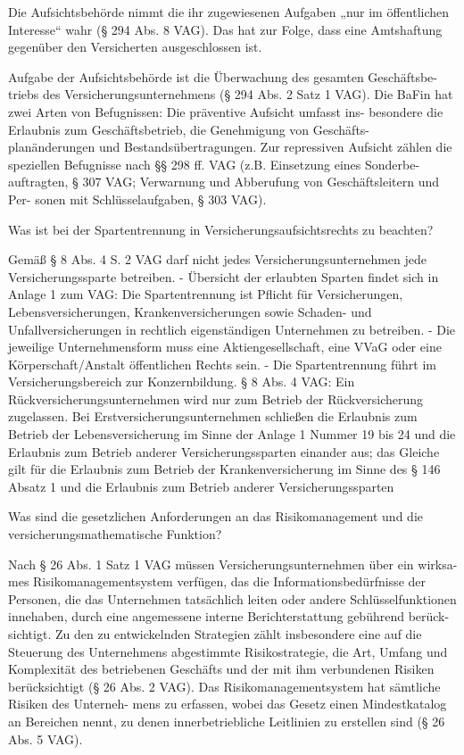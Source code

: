 Die Aufsichtsbehörde nimmt die ihr zugewiesenen Aufgaben „nur im öffentlichen
Interesse“ wahr (§ 294 Abs. 8 VAG). Das hat zur Folge, dass eine Amtshaftung
gegenüber den Versicherten ausgeschlossen ist.

Aufgabe der Aufsichtsbehörde ist die Überwachung des gesamten Geschäftsbe-
triebs des Versicherungsunternehmens (§ 294 Abs. 2 Satz 1 VAG).
Die BaFin hat zwei Arten von Befugnissen: Die präventive Aufsicht umfasst ins-
besondere die Erlaubnis zum Geschäftsbetrieb, die Genehmigung von Geschäfts-
planänderungen und Bestandsübertragungen. Zur repressiven Aufsicht zählen
die speziellen Befugnisse nach §§ 298 ff. VAG (z.B. Einsetzung eines Sonderbe-
auftragten, § 307 VAG; Verwarnung und Abberufung von Geschäftsleitern und Per-
sonen mit Schlüsselaufgaben, § 303 VAG).

Was ist bei der Spartentrennung in Versicherungsaufsichtsrechts zu beachten?

Gemäß § 8 Abs. 4 S. 2 VAG darf nicht jedes Versicherungsunternehmen jede Versicherungssparte
betreiben.
- Übersicht der erlaubten Sparten findet sich in Anlage 1 zum VAG: Die Spartentrennung ist Pflicht
für Versicherungen, Lebensversicherungen, Krankenversicherungen sowie Schaden- und
Unfallversicherungen in rechtlich eigenständigen Unternehmen zu betreiben.
- Die jeweilige Unternehmensform muss eine Aktiengesellschaft, eine VVaG oder eine
Körperschaft/Anstalt öffentlichen Rechts sein.
- Die Spartentrennung führt im Versicherungsbereich zur Konzernbildung.
§ 8 Abs. 4 VAG: Ein Rückversicherungsunternehmen wird nur zum Betrieb der Rückversicherung
zugelassen.
Bei Erstversicherungsunternehmen schließen die Erlaubnis zum Betrieb der Lebensversicherung im
Sinne der Anlage 1 Nummer 19 bis 24 und die Erlaubnis zum Betrieb anderer Versicherungssparten
einander aus; das Gleiche gilt für die Erlaubnis zum Betrieb der Krankenversicherung im Sinne des
§ 146 Absatz 1 und die Erlaubnis zum Betrieb anderer Versicherungssparten


Was sind die gesetzlichen Anforderungen an das Risikomanagement und die versicherungsmathematische Funktion?

Nach § 26 Abs. 1 Satz 1 VAG müssen Versicherungsunternehmen über ein wirksa-
mes Risikomanagementsystem verfügen, das die Informationsbedürfnisse der
Personen, die das Unternehmen tatsächlich leiten oder andere Schlüsselfunktionen
innehaben, durch eine angemessene interne Berichterstattung gebührend berück-
sichtigt.
Zu den zu entwickelnden Strategien zählt insbesondere eine auf die Steuerung des
Unternehmens abgestimmte Risikostrategie, die Art, Umfang und Komplexität des
betriebenen Geschäfts und der mit ihm verbundenen Risiken berücksichtigt (§ 26
Abs. 2 VAG). Das Risikomanagementsystem hat sämtliche Risiken des Unterneh-
mens zu erfassen, wobei das Gesetz einen Mindestkatalog an Bereichen nennt, zu
denen innerbetriebliche Leitlinien zu erstellen sind (§ 26 Abs. 5 VAG).

